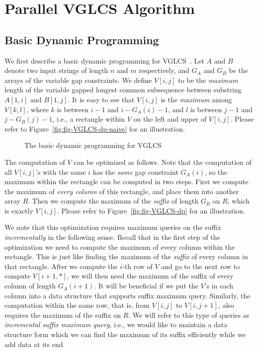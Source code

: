 \section{Parallel VGLCS Algorithm} \label{sec:parallelVGLCS}

\subsection{Basic Dynamic Programming}

We first describe a basic dynamic programming for
VGLCS~\cite{Peng2011TheLC}. Let $A$ and $B$ denote two input strings of
length $n$ and $m$ respectively, and $G_A$ and $G_B$ be the arrays of
the variable gap constraints.  We define $V[i, j]$ to be the {\em
maximum} length of the variable gapped longest common subsequence
between substring $A[1, i]$ and $B[1, j]$.  It is easy to see that $V[i,
j]$ is the {\em maximum} among $V[k, l]$, where $k$ is between $i -1$
and $i-G_A(i)-1$, and $l$ is between $j -1 $ and $j-G_B(j)-1$, i.e., a
rectangle within $V$ on the left and upper of $V[i,j]$.  Please refer to
Figure~\ref{fig:fig-VGLCS-dp-naive} for an illustration.

\begin{figure}[!thb]
  \centering {} 
  \caption{The basic dynamic programming for VGLCS}
  \label{fig:basic-dp-VGLCS}
\end{figure}

The computation of $V$ can be optimized as follows.  Note that the
computation of all $V[i, j]$'s with the same $i$ has the {\em same}
gap constraint $G_A(i)$, so the maximum within the rectangle can be
computed in two steps.  First we compute the maximum of {\em every
  column} of this rectangle, and place them into another array $R$.
Then we compute the maximum of the {\em suffix} of length $G_B$ on
$R$, which is exactly $V[i, j]$.  Please refer to
Figure~\ref{fig:fig-VGLCS-dp} for an illustration.

We note that this optimization requires maximum queries on the suffix
{\em incrementally} in the following sense.  Recall that in the first
step of the optimization we need to compute the maximum of every
column within the rectangle.  This is just like finding the maximum of
the {\em suffix} of every column in that rectangle.  After we compute
the $i$-th row of $V$ and go to the next row to compute $V[i + 1, *]$,
we will then need the maximum of the suffix of every column of length
$G_A(i + 1)$.  It will be beneficial if we put the $V$'s in each
column into a data structure that supports suffix maximum query.
Similarly, the computation within the same row, that is, from $V[i,j]$
to $V[i, j + 1]$, also requires the maximum of the suffix on $R$.  We
will refer to this type of queries as {\em incremental suffix maximum
  query}, i.e., we would like to maintain a data structure form which
we can find the maximum of its suffix efficiently while we add data at
its end.

